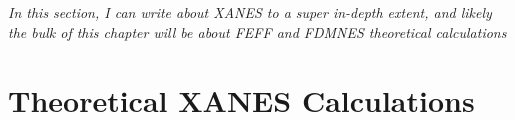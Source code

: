 \textit{In this section, I can write about XANES to a super in-depth extent, and likely the bulk of this chapter will be about FEFF and FDMNES theoretical calculations}

\section{Theoretical XANES Calculations}



